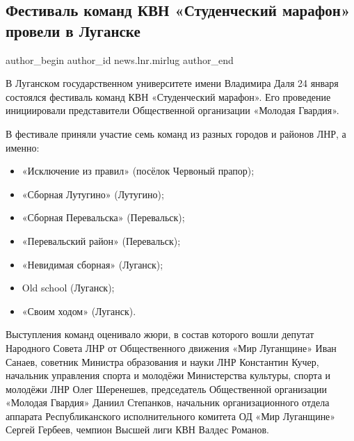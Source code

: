  
 
 
 
 
 
\subsection{Фестиваль команд КВН «Студенческий марафон» провели в Луганске}
\label{sec:24_01_2022.stz.news.lnr.mirlug.1.festival_kvn}
 
\ifcmt
 author_begin
   author_id news.lnr.mirlug
 author_end
\fi

В Луганском государственном университете имени Владимира Даля 24 января
состоялся фестиваль команд КВН «Студенческий марафон». Его проведение
инициировали представители Общественной организации «Молодая Гвардия».


В фестивале приняли участие семь команд из разных городов и районов ЛНР, а
именно:

\begin{itemize}
  \item «Исключение из правил» (посёлок Червоный прапор);
  \item «Сборная Лутугино» (Лутугино);
  \item «Сборная Перевальска» (Перевальск);
  \item «Перевальский район» (Перевальск);
  \item «Невидимая сборная» (Луганск);
  \item Old school (Луганск);
  \item «Своим ходом» (Луганск).
\end{itemize}

Выступления команд оценивало жюри, в состав которого вошли депутат Народного
Совета ЛНР от Общественного движения «Мир Луганщине» Иван Санаев, советник
Министра образования и науки ЛНР Константин Кучер, начальник управления спорта
и молодёжи Министерства культуры, спорта и молодёжи ЛНР Олег Шеренешев,
председатель Общественной организации «Молодая Гвардия» Даниил Степанков,
начальник организационного отдела аппарата Республиканского исполнительного
комитета ОД «Мир Луганщине» Сергей Гербеев, чемпион Высшей лиги КВН Валдес
Романов.

